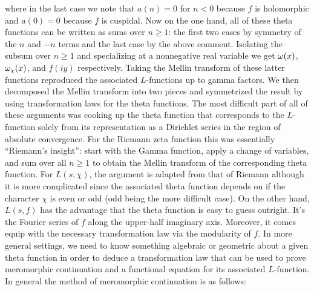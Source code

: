     where in the last case we note that $a(n) = 0$ for $n < 0$ because $f$ is holomorphic and $a(0) = 0$ because $f$ is cuspidal. Now on the one hand, all of these theta functions can be written as sums over $n \ge 1$: the first two cases by symmetry of the $n$ and $-n$ terms and the last case by the above comment. Isolating the subsum over $n \ge 1$ and specializing at a nonnegative real variable we get $\omega(x)$, $\omega_{\chi}(x)$, and $f(iy)$ respectively. Taking the Mellin transform of these latter functions reproduced the associated $L$-functions up to gamma factors. We then decomposed the Mellin transform into two pieces and symmetrized the result by using transformation laws for the theta functions. The most difficult part of all of these arguments was cooking up the theta function that corresponds to the $L$-function solely from its representation as a Dirichlet series in the region of absolute convergence. For the Riemann zeta function this was essentially ``Riemann's insight'': start with the Gamma function, apply a change of variables, and sum over all $n \ge 1$ to obtain the Mellin transform of the corresponding theta function. For $L(s,\chi)$, the argument is adapted from that of Riemann although it is more complicated since the associated theta function depends on if the character $\chi$ is even or odd (odd being the more difficult case). On the other hand, $L(s,f)$ has the advantage that the theta function is easy to guess outright. It's the Fourier series of $f$ along the upper-half imaginary axis. Moreover, it comes equip with the necessary transformation law via the modularity of $f$. In more general settings, we need to know something algebraic or geometric about a given theta function in order to deduce a transformation law that can be used to prove meromorphic continuation and a functional equation for its associated $L$-function. In general the method of meromorphic continuation is as follows:

